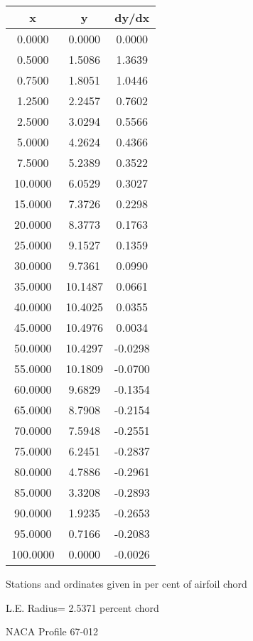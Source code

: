 \documentclass[11pt]{book}
\begin{document}
 \vspace{8mm}
 \begin{tabular}{|c|c|c|} \hline 
  x  &  y  &  dy/dx \\
 \hline
0.0000 & 0.0000 & 0.0000 \\
0.5000 & 1.5086 & 1.3639 \\
0.7500 & 1.8051 & 1.0446 \\
1.2500 & 2.2457 & 0.7602 \\
2.5000 & 3.0294 & 0.5566 \\
5.0000 & 4.2624 & 0.4366 \\
7.5000 & 5.2389 & 0.3522 \\
10.0000 & 6.0529 & 0.3027 \\
15.0000 & 7.3726 & 0.2298 \\
20.0000 & 8.3773 & 0.1763 \\
25.0000 & 9.1527 & 0.1359 \\
30.0000 & 9.7361 & 0.0990 \\
35.0000 & 10.1487 & 0.0661 \\
40.0000 & 10.4025 & 0.0355 \\
45.0000 & 10.4976 & 0.0034 \\
50.0000 & 10.4297 & -0.0298 \\
55.0000 & 10.1809 & -0.0700 \\
60.0000 & 9.6829 & -0.1354 \\
65.0000 & 8.7908 & -0.2154 \\
70.0000 & 7.5948 & -0.2551 \\
75.0000 & 6.2451 & -0.2837 \\
80.0000 & 4.7886 & -0.2961 \\
85.0000 & 3.3208 & -0.2893 \\
90.0000 & 1.9235 & -0.2653 \\
95.0000 & 0.7166 & -0.2083 \\
100.0000 & 0.0000 & -0.0026 \\
 \hline
 \end{tabular}
 \vspace{8mm}


Stations and ordinates given in per cent of airfoil chord 


L.E. Radius=  2.5371 percent chord
 \newpage
  \label{p67-012}
 \begin{Large}
 NACA Profile 67-012
 \end{Large}
  
\end{document}
